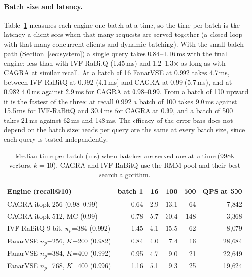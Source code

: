 \documentclass[fleqn,10pt]{wlscirep}
\begin{document}
\paragraph{Batch size and latency.} Table~\ref{tab:lat} measures each engine one batch at a time, so the time per batch is the latency a client sees when that many requests are served together (a closed loop with that many concurrent clients and dynamic batching). With the small-batch path (Section~\ref{sec:system}) a single query takes 0.84--1.16\,ms with the final engine: less than with IVF-RaBitQ (1.45\,ms) and 1.2--1.3$\times$ as long as with CAGRA at similar recall. At a batch of 16 FanarVSE at 0.992 takes 4.7\,ms, between IVF-RaBitQ at 0.992 (4.1\,ms) and CAGRA at 0.99 (5.7\,ms), and at 0.982 4.0\,ms against 2.9\,ms for CAGRA at 0.98--0.99. From a batch of 100 upward it is the fastest of the three: at recall 0.992 a batch of 100 takes 9.0\,ms against 15.5\,ms for IVF-RaBitQ and 30.4\,ms for CAGRA at 0.99, and a batch of 500 takes 21\,ms against 62\,ms and 148\,ms. The efficacy of the error bars does not depend on the batch size: reads per query are the same at every batch size, since each query is tested independently.

\begin{table}[!htbp]
\caption{Median time per batch (ms) when batches are served one at a time (998k vectors, $k=10$). CAGRA and IVF-RaBitQ use the RMM pool and their best search algorithm.}
\label{tab:lat}
\small
\begin{tabular}{lrrrrr}
\toprule
Engine (recall@10) & batch 1 & 16 & 100 & 500 & QPS at 500 \\
\midrule
CAGRA itopk 256 (0.98--0.99) & 0.64 & 2.9 & 13.1 & 64 & 7{,}842 \\
CAGRA itopk 512, MC (0.99) & 0.78 & 5.7 & 30.4 & 148 & 3{,}368 \\
IVF-RaBitQ 9 bit, $n_p$=384 (0.992) & 1.45 & 4.1 & 15.5 & 62 & 8{,}079 \\
FanarVSE $n_p$=256, $K$=200 (0.982) & 0.84 & 4.0 & 7.4 & 16 & 28{,}684 \\
FanarVSE $n_p$=384, $K$=400 (0.992) & 0.95 & 4.7 & 9.0 & 21 & 22{,}649 \\
FanarVSE $n_p$=768, $K$=400 (0.996) & 1.16 & 5.1 & 9.3 & 25 & 19{,}624 \\
\bottomrule
\end{tabular}
\end{table}
\end{document}

